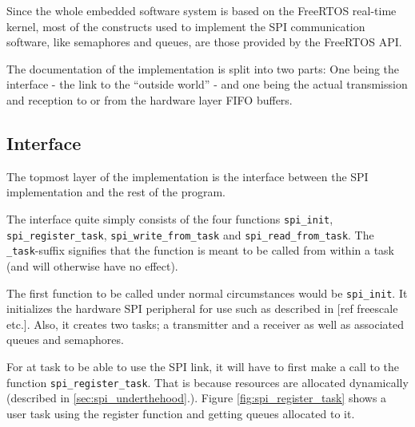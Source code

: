 Since the whole embedded software system is based on the FreeRTOS real-time kernel, most of the constructs used to implement the SPI communication software, like semaphores and queues, are those provided by the FreeRTOS API.

The documentation of the implementation is split into two parts: One being the interface - the link to the ``outside world'' - and one being the actual transmission and reception to or from the hardware layer FIFO buffers.




\subsection{Interface}
The topmost layer of the implementation is the interface between the SPI implementation and the rest of the program.

The interface quite simply consists of the four functions \texttt{spi\_init}, \texttt{spi\_register\_task}, \texttt{spi\_write\_from\_task} and \texttt{spi\_read\_from\_task}. The \texttt{\_task}-suffix signifies that the function is meant to be called from within a task (and will otherwise have no effect).

The first function to be called under normal circumstances would be \texttt{spi\_init}. It initializes the hardware SPI peripheral for use such as described in [ref freescale etc.]. Also, it creates two tasks; a transmitter and a receiver as well as associated queues and semaphores.

For at task to be able to use the SPI link, it will have to first make a call to the function \texttt{spi\_register\_task}. That is because resources are allocated dynamically (described in \ref{sec:spi_underthehood}.). Figure \ref{fig:spi_register_task} shows a user task using the register function and getting queues allocated to it. 

